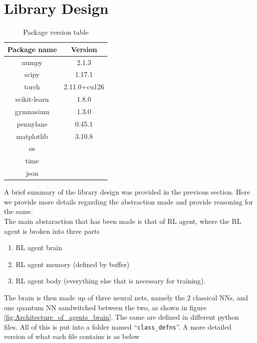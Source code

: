 \documentclass{article}
\begin{document}
\section{Library Design}
\begin{table}[t]
    \centering
    \begin{tabular}{|c|c|}
        \hline
       Package name & Version\\
        \hline 
        numpy& 2.1.3\\
       scipy & 1.17.1\\
       torch & 2.11.0+cu126\\
        scikit-learn & 1.8.0\\
       gymnasium & 1.3.0\\
       pennylane & 0.45.1\\
       matplotlib & 3.10.8\\
       os & \\
       time & \\
       json & \\ 
        \hline
    \end{tabular}
    \caption{Package version table}
    \label{tab:package_version_table}
\end{table}
A brief summary of the library design was provided in the previous section. Here we provide more details regarding the abstraction made and provide reasoning for the same. \\
The main abstaraction that has been made is that of RL agent, where the RL agent is broken into three parts
\begin{enumerate}
    \item RL agent brain 
    \item RL agent memory (defined by buffer)
    \item RL agent body (everything else that is necessary for training).
\end{enumerate}
The brain is then made up of three neural nets, namely the $2$ classical NNs, and one quantum NN sandwitched between the two, as shown in figure \ref{fig:Architecture_of_agents_brain}. The same are defined in different python files. All of this is put into a folder named  ``\texttt{class\_defns}''. A more detailed version of what each file contains is as below
\end{document}
